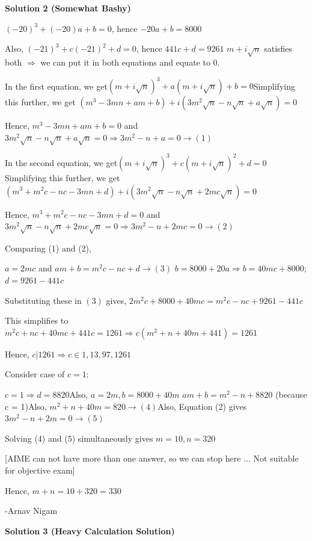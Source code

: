 \begin{enumerate}
\textbf{Solution 2 (Somewhat Bashy)}

$(-20)^{3} + (-20)a + b = 0$, hence $-20a + b = 8000$

 Also, $(-21)^{3} + c(-21)^{2} + d = 0$, hence $441c + d = 9261$
$m + i \sqrt{n}$ satisfies both $\Rightarrow$ we can put it in both equations and equate to 0.

 In the first equation, we get$(m + i \sqrt{n})^{3} + a(m + i \sqrt{n}) + b = 0$Simplifying this further, we get $(m^{3} - 3mn + am + b) + i(3m^{2} \sqrt{n} - n\sqrt{n} + a\sqrt{n}) = 0$

 Hence, $m^{3} - 3mn + am + b = 0$ and $3m^{2} \sqrt{n} - n\sqrt{n} + a\sqrt{n} = 0 \Rightarrow 3m^{2} - n + a = 0 \rightarrow (1)$

 In the second equation, we get$(m + i \sqrt{n})^{3} + c(m + i \sqrt{n})^{2} + d = 0$Simplifying this further, we get $(m^{3} + m^{2}c - nc - 3mn + d) + i(3m^{2} \sqrt{n} - n\sqrt{n} + 2mc\sqrt{n}) = 0$

 Hence, $m^{3} + m^{2}c - nc - 3mn + d = 0$ and $3m^{2} \sqrt{n} - n\sqrt{n} + 2mc\sqrt{n} = 0 \Rightarrow 3m^{2} - n + 2mc = 0 \rightarrow (2)$

 Comparing (1) and (2),

 $a = 2mc$ and $am + b = m^{2}c - nc + d \rightarrow (3)$
$b = 8000 + 20a \Rightarrow b = 40mc + 8000$; $d = 9261 - 441c$

 Substituting these in $(3)$ gives, $2m^{2}c + 8000 + 40mc = m^{2}c - nc + 9261 - 441c$

 This simplifies to $m^{2}c + nc + 40mc + 441c = 1261 \Rightarrow c(m^{2} + n + 40m + 441) = 1261$

 Hence, $c|1261 \Rightarrow c \in {1,13,97,1261}$

 
Consider case of $c = 1$:

 $c = 1 \Rightarrow d = 8820$Also, $a = 2m, b = 8000 + 40m$
$am + b = m^{2} - n + 8820$ (because c = 1)Also, $m^{2} + n + 40m = 820 \rightarrow (4)$Also, Equation (2) gives $3m^{2} - n + 2m = 0 \rightarrow (5)$

 Solving (4) and (5) simultaneously gives $m = 10, n = 320$

 [AIME can not have more than one answer, so we can stop here ... Not suitable for objective exam]

 Hence, $m + n = 10 + 320 = \boxed{330}$

 -Arnav Nigam

 



\textbf{Solution 3 (Heavy Calculation Solution)}


\end{enumerate}

